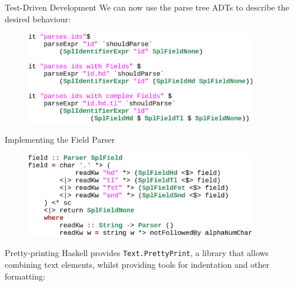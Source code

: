 \documentclass[department=icis, slidenumbers=slide, official=true]{beamerruhuisstijl}
\begin{document}
\begin{frame}{Test-Driven Development}
    We can now use the parse tree ADTs to describe the desired behaviour:
    \begin{figure}[b]
        \centering
        \includegraphics[width=0.9\textwidth]{imgs/fieldspec.png}
    \end{figure}
\end{frame}

\begin{frame}{Implementing the Field Parser}
    \begin{figure}[b]
        \centering
        \includegraphics[width=0.9\textwidth]{imgs/fieldimpl.png}
    \end{figure}
\end{frame}

\begin{frame}{Pretty-printing}
    Haskell provides \texttt{Text.PrettyPrint}, a library that allows
    combining text elements, whilst providing tools for indentation and
    other formatting:


\end{frame}
\end{document}
